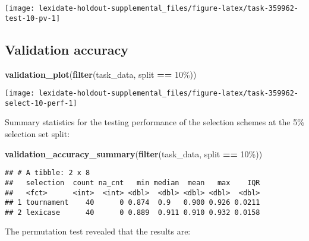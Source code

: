 \documentclass[
]{book}
\newenvironment{Shaded}{\begin{snugshade}}{\end{snugshade}}
\newcommand{\FunctionTok}[1]{\textcolor[rgb]{0.13,0.29,0.53}{\textbf{#1}}}
\newcommand{\NormalTok}[1]{#1}
\newcommand{\SpecialCharTok}[1]{\textcolor[rgb]{0.81,0.36,0.00}{\textbf{#1}}}
\newcommand{\StringTok}[1]{\textcolor[rgb]{0.31,0.60,0.02}{#1}}
\begin{document}
\texttt{[image: lexidate-holdout-supplemental\_files/figure-latex/task-359962-test-10-pv-1]}

\hypertarget{validation-accuracy-56}{%
\subsection{Validation accuracy}\label{validation-accuracy-56}}

\begin{Shaded}
\begin{Highlighting}[]
\FunctionTok{validation\_plot}\NormalTok{(}\FunctionTok{filter}\NormalTok{(task\_data, split }\SpecialCharTok{==} \StringTok{\textquotesingle{}10\%\textquotesingle{}}\NormalTok{))}
\end{Highlighting}
\end{Shaded}

\texttt{[image: lexidate-holdout-supplemental\_files/figure-latex/task-359962-select-10-perf-1]}

Summary statistics for the testing performance of the selection schemes at the 5\% selection set split:

\begin{Shaded}
\begin{Highlighting}[]
\FunctionTok{validation\_accuracy\_summary}\NormalTok{(}\FunctionTok{filter}\NormalTok{(task\_data, split }\SpecialCharTok{==} \StringTok{\textquotesingle{}10\%\textquotesingle{}}\NormalTok{))}
\end{Highlighting}
\end{Shaded}

\begin{verbatim}
## # A tibble: 2 x 8
##   selection  count na_cnt   min median  mean   max    IQR
##   <fct>      <int>  <int> <dbl>  <dbl> <dbl> <dbl>  <dbl>
## 1 tournament    40      0 0.874  0.9   0.900 0.926 0.0211
## 2 lexicase      40      0 0.889  0.911 0.910 0.932 0.0158
\end{verbatim}

The permutation test revealed that the results are:
\end{document}
